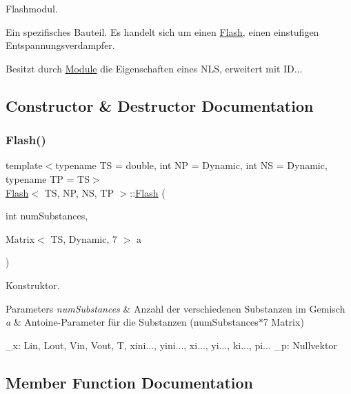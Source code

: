 Flashmodul. 

Ein spezifisches Bauteil. Es handelt sich um einen \mbox{\hyperlink{class_flash}{Flash}}, einen einstufigen Entspannungsverdampfer.

Besitzt durch \mbox{\hyperlink{class_module}{Module}} die Eigenschaften eines N\+LS, erweitert mit ID... 

\subsection{Constructor \& Destructor Documentation}
\mbox{\label{class_flash_afe08d3b05a9b5abe02071065b46abf62}} 
\subsubsection{\texorpdfstring{Flash()}{Flash()}}
{\footnotesize\ttfamily template$<$typename TS = double, int NP = Dynamic, int NS = Dynamic, typename TP = TS$>$ \\
\mbox{\hyperlink{class_flash}{Flash}}$<$ TS, NP, NS, TP $>$\+::\mbox{\hyperlink{class_flash}{Flash}} (\begin{DoxyParamCaption}\item[{int}]{num\+Substances,  }\item[{Matrix$<$ TS, Dynamic, 7 $>$}]{a }\end{DoxyParamCaption})\hspace{0.3cm}{\ttfamily [inline]}}



Konstruktor. 


\begin{DoxyParams}{Parameters}
{\em num\+Substances} & Anzahl der verschiedenen Substanzen im Gemisch \\
\hline
{\em a} & Antoine-\/\+Parameter für die Substanzen (num\+Substances$\ast$7 Matrix) \\
\hline
\end{DoxyParams}
\+\_\+x\+: Lin, Lout, Vin, Vout, T, xini..., yini..., xi..., yi..., ki..., pi... \+\_\+p\+: Nullvektor

\subsection{Member Function Documentation}
\mbox{\label{class_flash_a83e35b3ab13b3705f0fe06c40b800a8b}} 
